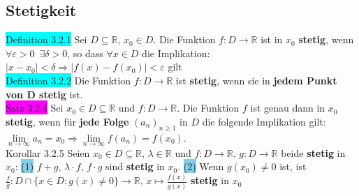\documentclass[landscape, 10pt]{article}
\newcommand{\R}{\mathbb{R}}
\begin{document}
\begin{multicols}{3}
       \subsection{Stetigkeit}
              \colorbox{cyan}{Definition 3.2.1} 
                     Sei $D\subseteq\R,\,x_0\in D$. 
                     Die Funktion \textcolor{NavyBlue}{$f:D\longrightarrow\R$} 
                     ist in $x_0$ \textbf{stetig}, 
                     wenn \textcolor{NavyBlue}{
                     $\forall\varepsilon>0\enspace\exists\delta>0$}, 
                     so dass 
                     \textcolor{NavyBlue}{$\forall x\in D$} die Implikation: 
                     \textcolor{NavyBlue}{
                     $|x-x_0|<\delta\Rightarrow|f(x)-f(x_0)|<\varepsilon$} gilt\\
              \colorbox{cyan}{Definition 3.2.2} 
                     Die Funktion \textcolor{NavyBlue}{$f:D\longrightarrow\R$}
                     ist \textbf{stetig}, wenn sie in 
                     \textbf{jedem Punkt von D stetig} ist.\\
              \colorbox{magenta}{Satz 3.2.4} Sei 
                     \textcolor{NavyBlue}{$x_0\in D\subseteq\R$} und 
                     \textcolor{NavyBlue}{$f:D\longrightarrow\R$}. 
                     Die Funktion \textcolor{NavyBlue}{$f$} ist genau 
                     dann in \textcolor{NavyBlue}{$x_0$} \textbf{stetig}, wenn für 
                     \textbf{jede Folge} 
                     \textcolor{NavyBlue}{$(a_n)_{n\geqslant1}$} 
                     in $D$ die folgende Implikation gilt: \textcolor{NavyBlue}{
                     $\lim\limits_{n\to\infty}a_n=x_0\Longrightarrow
                     \lim\limits_{n\to\infty}f(a_n)=f(x_0)$}.\\
              \colorbox{BurntOrange}{Korollar 3.2.5} Seien 
                     \textcolor{NavyBlue}{$x_0\in D\subseteq\R,\,\lambda\in\R$} und 
                     \textcolor{NavyBlue}{
                     $f:D\longrightarrow\R,\,g:D\longrightarrow\R$}
                     beide \textbf{stetig} in \textcolor{NavyBlue}{$x_0$}:
                     \colorbox{SkyBlue}{(1)} \textcolor{NavyBlue}{
                     $f+g,\,\lambda\cdot f,\,f\cdot g$} 
                     sind \textbf{stetig} in \textcolor{NavyBlue}{$x_0$}.
                     \colorbox{SkyBlue}{(2)} Wenn $g(x_0)\neq0$ ist, ist 
                     \textcolor{NavyBlue}{
                     $\frac{f}{g}:D\cap\{x\in D:g(x)\neq0\}\longrightarrow\R,\,
                     x\longmapsto\frac{f(x)}{g(x)}$} 
                     \textbf{stetig} in \textcolor{NavyBlue}{$x_0$}\\

\end{multicols}
\end{document}
